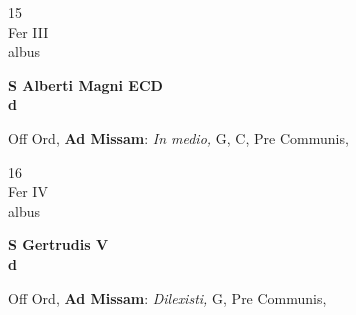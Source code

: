 \documentclass[10pt, openany]{book}
\begin{document}
        \begin{center}
            \begin{minipage}{3.5in}
                \vspace{2em}
                \begin{minipage}{0.5in}
                    {\Huge 15} \\
                    {\normalsize Fer III} \\
                    {\normalsize albus}
                \end{minipage}
                \begin{minipage}{3.0in}
                    \textbf{ \large S Alberti Magni ECD \\
                    \textnormal{\normalsize d}} \\ 
                \end{minipage}
                \begin{justify}Off Ord, \textbf{Ad Missam}: \textit{In medio,} G, C, Pre Communis,  
                \end{justify}
            \end{minipage}
        \end{center}
    
        \begin{center}
            \begin{minipage}{3.5in}
                \vspace{2em}
                \begin{minipage}{0.5in}
                    {\Huge 16} \\
                    {\normalsize Fer IV} \\
                    {\normalsize albus}
                \end{minipage}
                \begin{minipage}{3.0in}
                    \textbf{ \large S Gertrudis V \\
                    \textnormal{\normalsize d}} \\ 
                \end{minipage}
                \begin{justify}Off Ord, \textbf{Ad Missam}: \textit{Dilexisti,} G, Pre Communis,  
                \end{justify}
            \end{minipage}
        \end{center}
    
\end{document}
